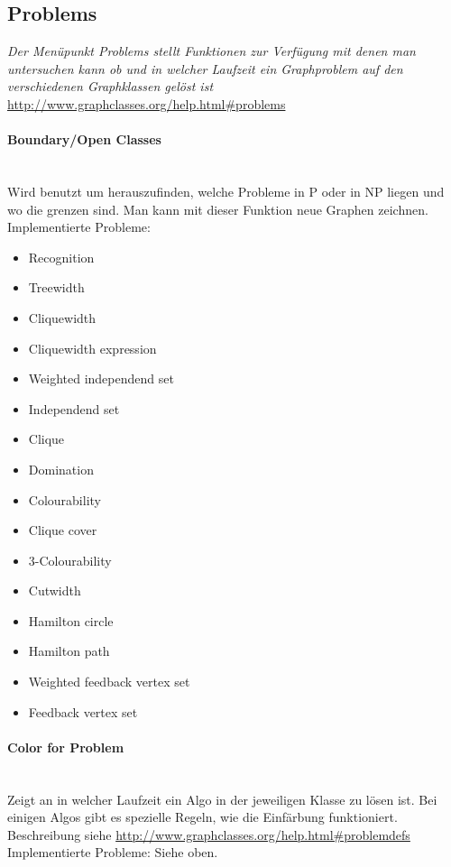 \documentclass[10pt,a4paper]{article}
\begin{document}
\subsection{Problems}
\emph{Der Menüpunkt Problems stellt Funktionen zur Verfügung mit denen man untersuchen kann ob und in welcher Laufzeit ein Graphproblem auf den verschiedenen Graphklassen gelöst ist} \\
\href{http://www.graphclasses.org/help.html\#problems}{http://www.graphclasses.org/help.html\#problems}
\paragraph{Boundary/Open Classes} \ \\
Wird benutzt um herauszufinden, welche Probleme in P oder in NP liegen und wo die grenzen sind. Man kann mit dieser Funktion neue Graphen zeichnen.
Implementierte Probleme:
\begin{itemize}
\item Recognition
\item Treewidth
\item Cliquewidth
\item Cliquewidth expression
\item Weighted independend set
\item Independend set
\item Clique
\item Domination
\item Colourability
\item Clique cover
\item 3-Colourability
\item Cutwidth
\item Hamilton circle
\item Hamilton path
\item Weighted feedback vertex set
\item Feedback vertex set
\end{itemize}
\paragraph{Color for Problem} \ \\
Zeigt an in welcher Laufzeit ein Algo in der jeweiligen Klasse zu lösen ist.  Bei einigen Algos gibt es spezielle Regeln, wie die Einfärbung funktioniert. Beschreibung siehe \href{http://www.graphclasses.org/help.html\#problemdefs}{http://www.graphclasses.org/help.html\#problemdefs} \\
Implementierte Probleme:
Siehe oben.
\end{document}
